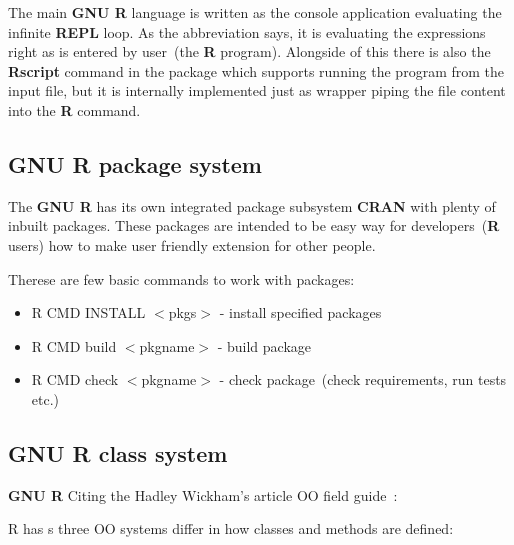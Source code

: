 \documentclass[thesis=M,english]{FITthesis}[2018/10/20]
\begin{document}
The main \textbf{GNU R} language is written as the console application evaluating the infinite \textbf{REPL} loop. As the abbreviation says, it is evaluating the expressions right as is entered by user~(the \textbf{R} program). Alongside of this there is also the \textbf{Rscript} command in the package which supports running the program from the input file, but it is internally implemented just as wrapper piping the file content into the \textbf{R} command.

\subsection{GNU R package system}\label{R-Packages}

The \textbf{GNU R} has its own integrated package subsystem \textbf{CRAN} with plenty of inbuilt packages. These packages are intended to be easy way for developers~(\textbf{R} users) how to make user friendly extension for other people.

Therese are few basic commands to work with packages:

\begin{itemize}
	\item R CMD INSTALL $<$pkgs$>$ - install specified packages
	\item R CMD build $<$pkgname$>$ - build package
	\item R CMD check $<$pkgname$>$ - check package~(check requirements, run tests etc.)
\end{itemize}



\subsection{GNU R class system}\label{R-Classes}

\textbf{GNU R} Citing the Hadley Wickham's article OO field guide~\cite{R-OO}:

R has s three OO systems differ in how classes and methods are defined:
\end{document}
